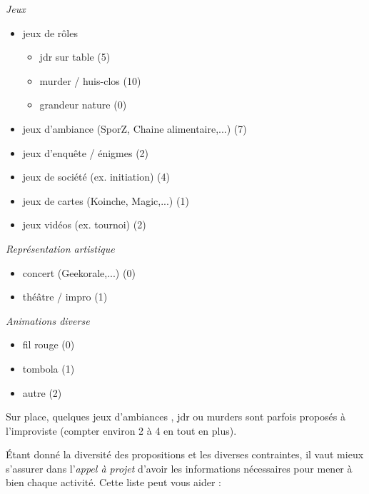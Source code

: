 \begin{minipage}{0.5\textwidth}
\emph{Jeux}
\begin{itemize}
    \item jeux de rôles
    \begin{itemize}
        \item jdr sur table (5)
        \item murder / huis-clos (10)
        \item grandeur nature (0)
    \end{itemize}
    \item jeux d'ambiance (SporZ, Chaine alimentaire,...) (7)
    \item jeux d'enquête / énigmes (2)
    \item jeux de société (ex. initiation) (4)
    \item jeux de cartes (Koinche, Magic,...) (1)
    \item jeux vidéos (ex. tournoi) (2)
\end{itemize}
\end{minipage}
\begin{minipage}{0.5\textwidth}
\emph{Représentation artistique}
\begin{itemize}
    \item concert (Geekorale,...) (0)
    \item théâtre / impro (1)
\end{itemize}

\emph{Animations diverse}
\begin{itemize}
    \item fil rouge (0)
    \item tombola (1)
    \item autre (2)
\end{itemize}
\end{minipage}

Sur place, quelques jeux d'ambiances , jdr ou murders sont parfois proposés à l'improviste (compter environ 2 à 4 en tout en plus).

Étant donné la diversité des propositions et les diverses contraintes, il vaut mieux s'assurer dans l'\emph{appel à projet} d'avoir les informations nécessaires pour mener à bien chaque activité. Cette liste peut vous aider :


